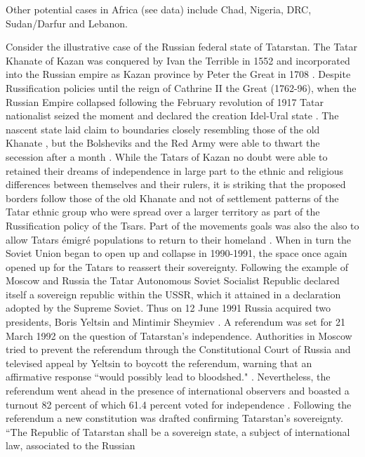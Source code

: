 \documentclass[12pt]{article}
\begin{document}
Other potential cases in Africa (see data) include Chad, Nigeria, DRC,
Sudan/Darfur and Lebanon.

Consider the illustrative case of the Russian federal state of Tatarstan. The
Tatar Khanate of Kazan was conquered by Ivan the Terrible in 1552 and
incorporated into the Russian empire as Kazan province by Peter the Great in
1708 \citep{Sharifzhanov_2007}. Despite Russification policies until the reign
of Cathrine II the Great (1762-96), when the Russian Empire collapsed following
the February revolution of 1917 Tatar nationalist seized the moment and declared
the creation Idel-Ural state \citep{Devlet_1993}. The nascent state laid claim
to boundaries closely resembling those of the old Khanate \citep{Hartley2020},
but the Bolsheviks and the Red Army were able to thwart the secession after a
month \citep{Hartley2020}. While the Tatars of Kazan no doubt were able to
retained their dreams of independence in large part to the ethnic and religious
differences between themselves and their rulers, it is striking that the
proposed borders follow those of the old Khanate and not of settlement patterns
of the Tatar ethnic group who were spread over a larger territory as part of the
Russification policy of the Tsars. Part of the movements goals was also the also
to allow Tatars émigré populations to return to their homeland
\citep{Devlet_1993}. When in turn the Soviet Union began to open up and collapse
in 1990-1991, the space once again opened up for the Tatars to reassert their
sovereignty. Following the example of Moscow and Russia the Tatar Autonomous
Soviet Socialist Republic declared itself a sovereign republic within the USSR,
which it attained in a declaration adopted by the Supreme Soviet. Thus on 12
June 1991 Russia acquired two presidents, Boris Yeltsin and Mintimir Sheymiev
\citep{Sharifzhanov_2007}. A referendum was set for 21 March 1992 on the
question of Tatarstan's independence. Authorities in Moscow tried to prevent
the referendum through the Constitutional Court of Russia and televised appeal
by Yeltsin to boycott the referendum, warning that an affirmative response
``would possibly lead to bloodshed." \citep{Sharifzhanov_2007}.  Nevertheless,
the referendum went ahead in the presence of international observers and boasted
a turnout 82 percent of which 61.4 percent voted for independence
\citep{Devlet_1993}. Following the referendum a new constitution was drafted
confirming Tatarstan's sovereignty. ``The Republic of Tatarstan shall be a
sovereign state, a subject of international law, associated to the Russian
\end{document}
